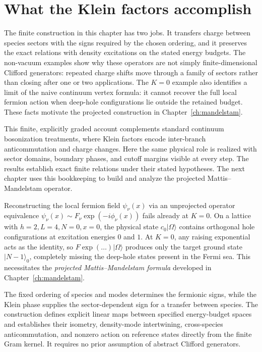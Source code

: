 \section{What the Klein factors accomplish}
\begin{remark}
The finite construction in this chapter has two jobs. It transfers charge
between species sectors with the signs required by the chosen ordering,
and it preserves the exact relations with density excitations on the
stated energy budgets. The non-vacuum examples show why these operators are
not simply finite-dimensional Clifford generators: repeated charge shifts
move through a family of sectors rather than closing after one or two
applications. The $K=0$ example also identifies a limit of the naive
continuum vertex formula: it cannot recover the full local fermion action
when deep-hole configurations lie outside the retained budget. These facts
motivate the projected construction in Chapter~\ref{ch:mandelstam}.

This finite, explicitly graded account complements standard continuum
bosonization treatments, where Klein factors encode inter-branch
anticommutation and charge changes. Here the same physical role is realized
with sector domains, boundary phases, and cutoff margins visible at every
step. The results establish exact finite relations under their stated
hypotheses. The next chapter uses this bookkeeping to build and analyze the
projected Mattis--Mandelstam operator.
\end{remark}

\begin{remark}[The $K=0$ Obstruction and the Mattis--Mandelstam Construction]
Reconstructing the local fermion field $\psi_\nu(x)$ via an unprojected operator equivalence $\psi_\nu(x) \sim F_\nu \exp(-i \phi_\nu(x))$ fails already at $K = 0$. On a lattice with $h=2, L=4, N=0, x=0$, the physical state $c_0 |\Omega\rangle$ contains orthogonal hole configurations at excitation energies $0$ and $1$. At $K=0$, any raising exponential acts as the identity, so $F \exp(\dots) |\Omega\rangle$ produces only the target ground state $|N-1\rangle_0$, completely missing the deep-hole states present in the Fermi sea. This necessitates the \emph{projected Mattis--Mandelstam formula} developed in Chapter~\ref{ch:mandelstam}.
\end{remark}

\begin{remark}
The fixed ordering of species and modes determines the fermionic signs, while the Klein phase supplies the sector-dependent sign for a transfer between species. The construction defines explicit linear maps between specified energy-budget spaces and establishes their isometry, density-mode intertwining, cross-species anticommutation, and nonzero action on reference states directly from the finite Gram kernel. It requires no prior assumption of abstract Clifford generators.
\end{remark}
